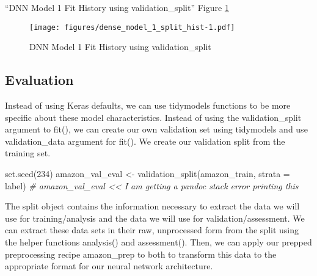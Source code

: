 \documentclass[
]{article}
\newenvironment{Shaded}{}{}
\newcommand{\AttributeTok}[1]{\textcolor[rgb]{0.49,0.56,0.16}{#1}}
\newcommand{\CommentTok}[1]{\textcolor[rgb]{0.38,0.63,0.69}{\textit{#1}}}
\newcommand{\DecValTok}[1]{\textcolor[rgb]{0.25,0.63,0.44}{#1}}
\newcommand{\FunctionTok}[1]{\textcolor[rgb]{0.02,0.16,0.49}{#1}}
\newcommand{\NormalTok}[1]{#1}
\newcommand{\OtherTok}[1]{\textcolor[rgb]{0.00,0.44,0.13}{#1}}
\newcommand{\SpecialCharTok}[1]{\textcolor[rgb]{0.25,0.44,0.63}{#1}}
\newcommand{\StringTok}[1]{\textcolor[rgb]{0.25,0.44,0.63}{#1}}
\begin{document}
``DNN Model 1 Fit History using validation\_split'' Figure
\ref{fig:model_10}

\begin{figure}
\centering
\texttt{[image: figures/dense\_model\_1\_split\_hist-1.pdf]}
\caption{DNN Model 1 Fit History using
validation\_split\label{fig:model_10}}
\end{figure}

\newpage

\hypertarget{evaluation}{%
\subsection{Evaluation}\label{evaluation}}

Instead of using Keras defaults, we can use tidymodels functions to be
more specific about these model characteristics. Instead of using the
validation\_split argument to fit(), we can create our own validation
set using tidymodels and use validation\_data argument for fit(). We
create our validation split from the training set.

\begin{Shaded}
\begin{Highlighting}[]
\FunctionTok{set.seed}\NormalTok{(}\DecValTok{234}\NormalTok{)}
\NormalTok{amazon\_val\_eval }\OtherTok{\textless{}{-}} \FunctionTok{validation\_split}\NormalTok{(amazon\_train, }\AttributeTok{strata =}\NormalTok{ label)}
\CommentTok{\# amazon\_val\_eval \textless{}\textless{} I am getting a pandoc stack error printing this}
\end{Highlighting}
\end{Shaded}

The split object contains the information necessary to extract the data
we will use for training/analysis and the data we will use for
validation/assessment. We can extract these data sets in their raw,
unprocessed form from the split using the helper functions analysis()
and assessment(). Then, we can apply our prepped preprocessing recipe
amazon\_prep to both to transform this data to the appropriate format
for our neural network architecture.

\begin{Shaded}
\end{Shaded}
\end{document}
